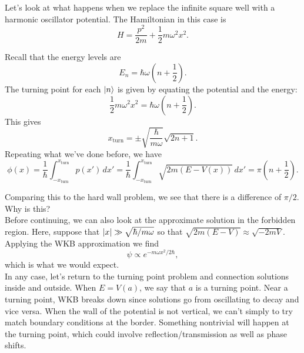 \documentclass{book}
\theoremstyle{definition}
\newcommand{\f}[2]{\frac{#1}{#2}}
\newcommand{\lp}{\left(}
\newcommand{\rp}{\right)}
\begin{document}
Let's look at what happens when we replace the infinite square well with a harmonic oscillator potential. The Hamiltonian in this case is 
\begin{equation*}
H = \f{p^2}{2m} + \f{1}{2} m \omega^2 x^2.
\end{equation*}

Recall that the energy levels are 
\begin{equation*}
E_n = \hbar \omega \lp n+ \f{1}{2} \rp. 
\end{equation*}
The turning point for each $\ket{n}$ is given by equating the potential and the energy:
\begin{equation*}
\f{1}{2}m\omega^2 x^2 = \hbar \omega \lp n+ \f{1}{2} \rp. 
\end{equation*}
This gives
\begin{equation*}
x_\text{turn} = \pm  \sqrt{\f{\hbar}{m\omega}} \sqrt{2n + 1}.
\end{equation*}
Repeating what we've done before, we have
\begin{equation*}
\phi(x) = \f{1}{\hbar}\int_{-x_\text{turn}}^{x_\text{turn}} p(x')\,dx' = \f{1}{\hbar}\int_{-x_\text{turn}}^{x_\text{turn}} \sqrt{2m(E - V(x))}\,dx' = \pi \lp n + \f{1}{2} \rp. 
\end{equation*}

Comparing this to the hard wall problem, we see that there is a difference of $\pi/2$. Why is this?  \\

Before continuing, we can also look at the approximate solution in the forbidden region. Here, suppose that $\abs{x} \gg \sqrt{\hbar/m\omega}$ so that $\sqrt{2m(E-V)} \approx \sqrt{-2m V}$. Applying the WKB approximation we find 
\begin{equation*}
\psi \propto e^{-m\omega x^2/2\hbar},
\end{equation*}
which is what we would expect. \\



In any case, let's return to the turning point problem and connection solutions inside and outside. When $E = V(a)$, we say that $a$ is a turning point. Near a turning point, WKB breaks down since solutions go from oscillating to decay and vice versa. When the wall of the potential is not vertical, we can't simply to try match boundary conditions at the border. Something nontrivial will happen at the turning point, which could involve reflection/transmission as well as phase shifts.
\\
\end{document}
